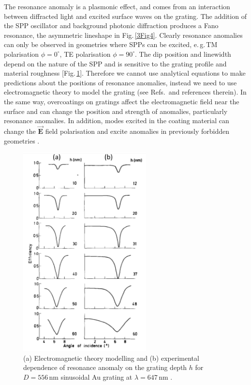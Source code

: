 The resonance anomaly is a plasmonic effect, and comes from an interaction between diffracted light and excited surface waves on the grating. The addition of the SPP oscillator and background photonic diffraction produces a Fano resonance, the asymmetric lineshape in Fig.\,\ref{3Fig4}. Clearly resonance anomalies can only be observed in geometries where SPPs can be excited, e.\,g.\,TM polarisation $\phi=0^{\circ}$, TE polarisation $\phi=90^{\circ}$. The dip position and linewidth depend on the nature of the SPP and is sensitive to the grating profile and material roughness [Fig.\,\ref{3Fig5}]. Therefore we cannot use analytical equations to make predictions about the positions of resonance anomalies, instead we need to use electromagnetic theory to model the grating (see Refs.\,\cite{Hutley1982, Loewen1997} and references therein). In the same way, overcoatings on gratings affect the electromagnetic field near the surface and can change the position and strength of anomalies, particularly resonance anomalies. In addition, modes excited in the coating material can change the $\vec{\mathbf{E}}$ field polarisation and excite anomalies in previously forbidden geometries \cite{Hutley1982, Loewen1997}.
\begin{figure}[h!] 
\centering    
\includegraphics[width=0.6\textwidth]{Fig5}
\caption{(a) Electromagnetic theory modelling and (b) experimental dependence of resonance anomaly on the grating depth $h$ for $D=556$\,nm sinusoidal Au grating at $\lambda=647$\,nm \cite{Hutley1976}. }
\label{3Fig5}
\end{figure}


